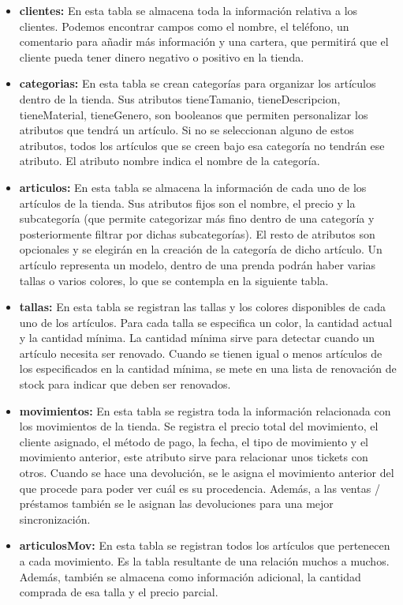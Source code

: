 \begin{itemize}
	\item \textbf{clientes:} En esta tabla se almacena toda la información relativa a los clientes. Podemos encontrar campos como el nombre, el teléfono, un comentario para añadir más información y una cartera, que permitirá que el cliente pueda tener dinero negativo o positivo en la tienda. 
	\item \textbf{categorias:} En esta tabla se crean categorías para organizar los artículos dentro de la tienda. Sus atributos tieneTamanio, tieneDescripcion, tieneMaterial, tieneGenero, son booleanos que permiten personalizar los atributos que tendrá un artículo. Si no se seleccionan alguno de estos atributos, todos los artículos que se creen bajo esa categoría no tendrán ese atributo. El atributo nombre indica el nombre de la categoría. 
	\item \textbf{articulos:} En esta tabla se almacena la información de cada uno de los artículos de la tienda. Sus atributos fijos son el nombre, el precio y la subcategoría (que permite categorizar más fino dentro de una categoría y posteriormente filtrar por dichas subcategorías). El resto de atributos son opcionales y se elegirán en la creación de la categoría de dicho artículo. Un artículo representa un modelo, dentro de una prenda podrán haber varias tallas o varios colores, lo que se contempla en la siguiente tabla. 
	\item \textbf{tallas:}  En esta tabla se registran las tallas y los colores disponibles de cada uno de los artículos. Para cada talla se especifica un color, la cantidad actual y la cantidad mínima. La cantidad mínima sirve para detectar cuando un artículo necesita ser renovado. Cuando se tienen igual o menos artículos de los especificados en la cantidad mínima, se mete en una lista de renovación de stock para indicar que deben ser renovados. 
	\item \textbf{movimientos:} En esta tabla se registra toda la información relacionada con los movimientos de la tienda. Se registra el precio total del movimiento, el cliente asignado, el método de pago, la fecha, el tipo de movimiento y el movimiento anterior, este atributo sirve para relacionar unos tickets con otros. Cuando se hace una devolución, se le asigna el movimiento anterior del que procede para poder ver cuál es su procedencia. Además, a las ventas / préstamos también se le asignan las devoluciones para una mejor sincronización.  
	\item \textbf{articulosMov:} En esta tabla se registran todos los artículos que pertenecen a cada movimiento. Es la tabla resultante de una relación muchos a muchos. Además, también se almacena como información adicional, la cantidad comprada de esa talla y el precio parcial. 
\end{itemize}



